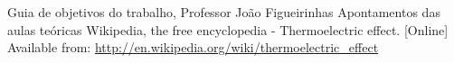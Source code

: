 \documentclass[9pt]{extarticle}
\begin{document}
\begin{multicols}{2}
\begin{thebibliography}{9}
 Guia de objetivos do trabalho, Professor João Figueirinhas
 Apontamentos das aulas teóricas
 Wikipedia, the free encyclopedia - Thermoelectric effect. [Online] Available from: \url{http://en.wikipedia.org/wiki/thermoelectric\_effect}
\end{thebibliography}



\vfill

\pagebreak

%

\end{multicols}
\end{document}
